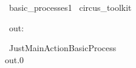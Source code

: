 
\begin{zsection}
  \SECTION\ basic\_processes1 \parents\ circus\_toolkit
\end{zsection}

\begin{circus}
    \circchannel\ out: \nat
\end{circus}

\begin{circus}
    \circprocess\ JustMainActionBasicProcess ~~\circdef~~ \circbegin \\
    \circspot out.0 \then \Skip \\
    \circend
\end{circus}
